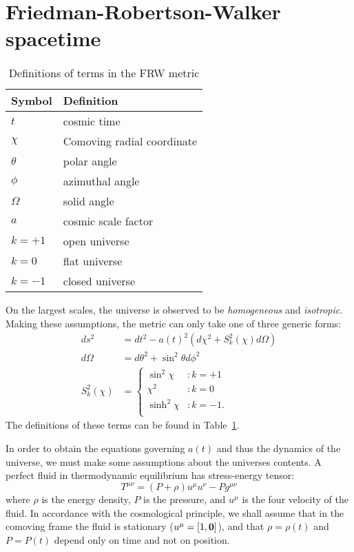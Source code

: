 \section{Friedman-Robertson-Walker spacetime}
\begin{table}
  \centering
\begin{tabular}{ll}
 \toprule
  Symbol & Definition \\
 \midrule
 \midrule
  $t$ & cosmic time \\
  $\chi$ & Comoving radial coordinate \\
  $\theta$ & polar angle \\
  $\phi$ & azimuthal angle \\
  $\Omega$ & solid angle \\
  $a$ & cosmic scale factor \\
  $k=+1$ & open universe \\
  $k=0$ & flat universe \\
  $k=-1$ & closed universe \\
 \bottomrule
\end{tabular}
\caption{Definitions of terms in the FRW metric}\label{tab:cos:metric}
\end{table}


On the largest scales, the universe is observed to be {\em homogeneous\/} and {\em isotropic}. Making these assumptions, the metric can only take one of three generic forms:
\begin{align}
  ds^2 &= dt^2 - a{(t)}^2\left( d\chi^2 + S_k^2{(\chi)} d\Omega \right)
  \label{eqn:cos:FRW_metric}\\
  d\Omega &= d\theta^2 + \sin^2\theta d\phi^2
  \label{eqn:cos:angle_element}\\
  S_k^2(\chi) &=
  \left\{
  \begin{array}{rl}
    \sin^2\chi &: k=+1 \\
    \chi^2 &: k=0 \\
    \sinh^2\chi &: k=-1. \\
  \end{array}
  \right.\label{eqn:cos:S_def}
\end{align}
The definitions of these terms can be found in Table~\ref{tab:cos:metric}. 

In order to obtain the equations governing $a(t)$ and thus the dynamics of the universe, we must make some assumptions about the universes contents. A perfect fluid in thermodynamic equilibrium has stress-energy tensor:
\begin{equation}
  T^{\mu\nu} = (P+\rho)u^{\mu}u^{\nu} - P g^{\mu\nu}
  \label{eqn:cos:SET_perfect_fluid}
\end{equation}
where $\rho$ is the energy density, $P$ is the pressure, and $u^\mu$ is the four velocity of the fluid. In accordance with the cosmological principle, we shall assume that in the comoving frame the fluid is stationary ($u^\mu = [1,\mathbf{0}]$), and that $\rho=\rho(t)$ and $P=P(t)$ depend only on time and not on position.  

